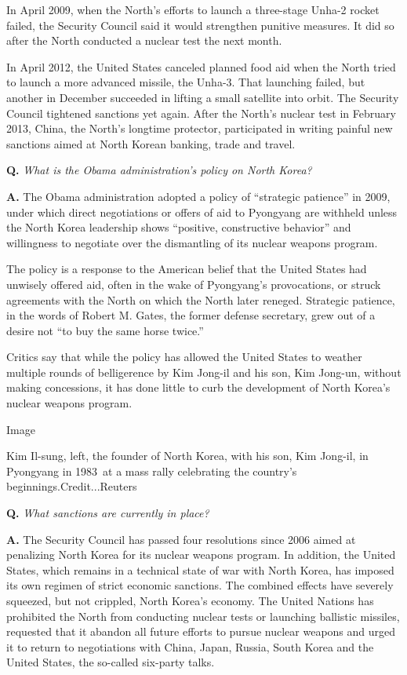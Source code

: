 In April 2009, when the North's efforts to launch a three-stage Unha-2
rocket failed, the Security Council said it would strengthen punitive
measures. It did so after the North conducted a nuclear test the next
month.

In April 2012, the United States canceled planned food aid when the
North tried to launch a more advanced missile, the Unha-3. That
launching failed, but another in December succeeded in lifting a small
satellite into orbit. The Security Council tightened sanctions yet
again. After the North's nuclear test in February 2013, China, the
North's longtime protector, participated in writing painful new
sanctions aimed at North Korean banking, trade and travel.

\textbf{Q.} \emph{What is the Obama administration's policy on North
Korea?}

\textbf{A.} The Obama administration adopted a policy of ``strategic
patience'' in 2009, under which direct negotiations or offers of aid to
Pyongyang are withheld unless the North Korea leadership shows
``positive, constructive behavior'' and willingness to negotiate over
the dismantling of its nuclear weapons program.

The policy is a response to the American belief that the United States
had unwisely offered aid, often in the wake of Pyongyang's provocations,
or struck agreements with the North on which the North later reneged.
Strategic patience, in the words of Robert M. Gates, the former defense
secretary, grew out of a desire not ``to buy the same horse twice.''

Critics say that while the policy has allowed the United States to
weather multiple rounds of belligerence by Kim Jong-il and his son, Kim
Jong-un, without making concessions, it has done little to curb the
development of North Korea's nuclear weapons program.

Image

Kim Il-sung, left, the founder of North Korea, with his son, Kim
Jong-il, in Pyongyang in 1983~at a mass rally celebrating the country's
beginnings.Credit...Reuters

\textbf{Q.} \emph{What sanctions are currently in place?}

\textbf{A.} The Security Council has passed four resolutions since 2006
aimed at penalizing North Korea for its nuclear weapons program. In
addition, the United States, which remains in a technical state of war
with North Korea, has imposed its own regimen of strict economic
sanctions. The combined effects have severely squeezed, but not
crippled, North Korea's economy. The United Nations has prohibited the
North from conducting nuclear tests or launching ballistic missiles,
requested that it abandon all future efforts to pursue nuclear weapons
and urged it to return to negotiations with China, Japan, Russia, South
Korea and the United States, the so-called six-party talks.

